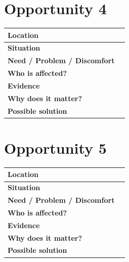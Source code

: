 \documentclass[12pt,a4paper]{article}
\begin{document}
	\section*{Opportunity 4}
	
	\begin{center}
		\small
		\begin{tabular}{|L{0.22\textwidth}|L{0.61\textwidth}|}
			\hline
			\textbf{Location} & \rule{0pt}{0.5cm} \\
			\hline
			\textbf{Situation} & \rule{0pt}{0.5cm} \\
			\hline
			\textbf{Need / Problem / Discomfort} & \rule{0pt}{0.5cm} \\
			\hline
			\textbf{Who is affected?} & \rule{0pt}{0.45cm} \\
			\hline
			\textbf{Evidence} & \rule{0pt}{0.6cm} \\
			\hline
			\textbf{Why does it matter?} & \rule{0pt}{0.5cm} \\
			\hline
			\textbf{Possible solution} & \rule{0pt}{0.45cm} \\
			\hline
		\end{tabular}
	\end{center}
	
	\vspace{0.15cm}
	
	\section*{Opportunity 5}
	
	\begin{center}
		\small
		\begin{tabular}{|L{0.22\textwidth}|L{0.61\textwidth}|}
			\hline
			\textbf{Location} & \rule{0pt}{0.5cm} \\
			\hline
			\textbf{Situation} & \rule{0pt}{0.5cm} \\
			\hline
			\textbf{Need / Problem / Discomfort} & \rule{0pt}{0.5cm} \\
			\hline
			\textbf{Who is affected?} & \rule{0pt}{0.45cm} \\
			\hline
			\textbf{Evidence} & \rule{0pt}{0.6cm} \\
			\hline
			\textbf{Why does it matter?} & \rule{0pt}{0.5cm} \\
			\hline
			\textbf{Possible solution} & \rule{0pt}{0.45cm} \\
			\hline
		\end{tabular}
	\end{center}
	
\end{document}
